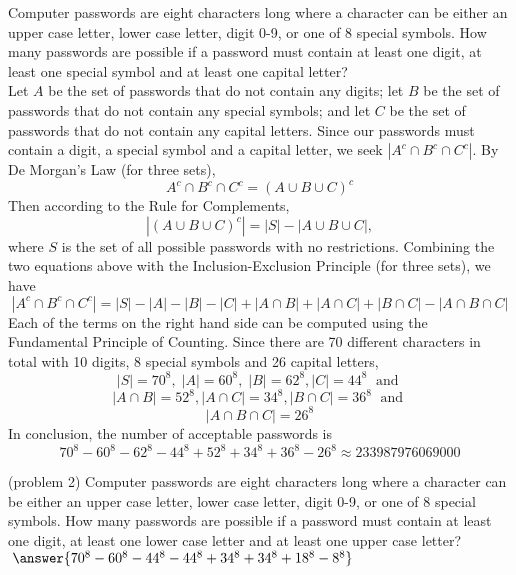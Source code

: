 \documentclass[handout]{ximera}
\begin{document}
\begin{example}[example 2]
Computer passwords are eight characters long where a character can be either an upper case letter, 
lower case letter, digit 0-9, or one of 8 special symbols. 
How many passwords are possible if a password must contain at least one digit, at least one special symbol
and at least one capital letter?\\

Let $A$ be the set of passwords that do not contain any digits; let $B$ be the set of 
passwords that do not contain any special symbols; and let $C$ be the set of passwords 
that do not contain any capital letters. 
Since our passwords must contain a digit, a special symbol and a capital letter, we seek $|A^c \cap B^c \cap C^c|$.
By De Morgan's Law (for three sets), 
\[
A^c \cap B^c  \cap C^c= (A \cup B \cup C)^c
\]
Then according to the Rule for Complements,
\[
|(A \cup B \cup C)^c| = |S| - |A \cup B \cup C|,
\]
where $S$ is the set of all possible passwords with no restrictions. 
Combining the two equations above with the Inclusion-Exclusion Principle (for three sets), we have
\[
|A^c \cap B^c \cap C^c| = |S| - |A| - |B| - |C| + |A\cap B|+ |A\cap C|+ |B\cap C|- |A\cap B \cap C|
\]
Each of the terms on the right hand side can be computed using the Fundamental Principle of Counting. Since there are
70 different characters in total with 10 digits, 8 special symbols and 26 capital letters,
\[
|S| = 70^8, \; |A| = 60^8, \; |B| = 62^8, |C| = 44^8 \; \text{ and } 
\]
\[
 |A\cap B| = 52^8, |A\cap C| = 34^8, |B\cap C| = 36^8 \; \text{ and }
 \]
 \[
 |A\cap B\cap C| = 26^8
\]
In conclusion, the number of acceptable passwords is
\[
70^8 - 60^8 - 62^8 - 44^8 + 52^8 + 34^8 + 36^8 - 26^8 \approx 233987976069000
\]

\end{example}

\begin{problem}(problem 2)
Computer passwords are eight characters long where a character can be either an upper case letter, 
lower case letter, digit 0-9, or one of 8 special symbols. 
How many passwords are possible if a password must contain at least one digit, at least one lower case 
letter and at least one upper case letter? $\; \answer{70^8 - 60^8 - 44^8- 44^8 + 34^8 + 34^8 + 18^8 -8^8}$\\

\end{problem}
\end{document}
